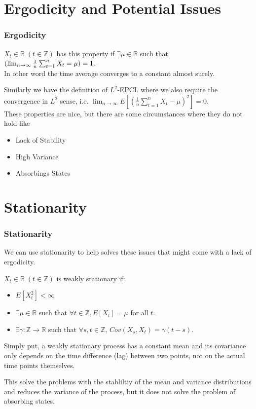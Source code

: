 \documentclass{beamer}
\let\P\relax
\newcommand{\P}{\mathbb{P}}
\begin{document}
\section{Ergodicity and Potential Issues}
\begin{frame}
    \frametitle{Ergodicity}
    \begin{definition}
        $X_t \in \mathbb{R} \; (t \in \mathbb{Z})$ has this property if $\exists \mu \in \mathbb{R}$ such that $
        \P(\lim_{n \to \infty} \frac{1}{n} \sum_{t=1}^{n} X_t = \mu) = 1$.\\
        In other word the time average converges to a constant almost surely.
    \end{definition}
    Similarly we have the definition of $L^2$-EPCL where we also require the convergence in $L^2$ sense, i.e. $\lim_{n \to \infty} E[(\frac{1}{n} \sum_{t=1}^{n} X_t - \mu)^2] = 0$.\\
    These properties are nice, but there are some circumstances where they do not hold like
    \begin{itemize}
        \item Lack of Stability 
        \item High Variance
        \item Absorbings States
    \end{itemize}
\end{frame}

\section{Stationarity}
\begin{frame}
    \frametitle{Stationarity}
    We can use stationarity to help solves these issues that might come with a lack of ergodicity.\\
    \begin{definition}
        $X_t \in \mathbb{R} \; (t \in \mathbb{Z})$ is weakly stationary if:
        \begin{itemize}
            \item $E[X_t^2] < \infty$
            \item $\exists \mu \in \mathbb{R}$ such that $\forall t \in \mathbb{Z}, E[X_t] = \mu$ for all $t$.
            \item $\exists \gamma: \mathbb{Z} \to \mathbb{R}$ such that $\forall s,t \in \mathbb{Z}$, $Cov(X_s, X_t) = \gamma(t-s)$.
        \end{itemize}
        Simply put, a weakly stationary process has a constant mean and its covariance only depends on the time difference (lag) between two points, not on the actual time points themselves.
    \end{definition}
    This solve the problems with the stabliltiy of the mean and variance distributions and reduces the variance of the process, but it does not solve the problem of absorbing states.
\end{frame}
\end{document}
